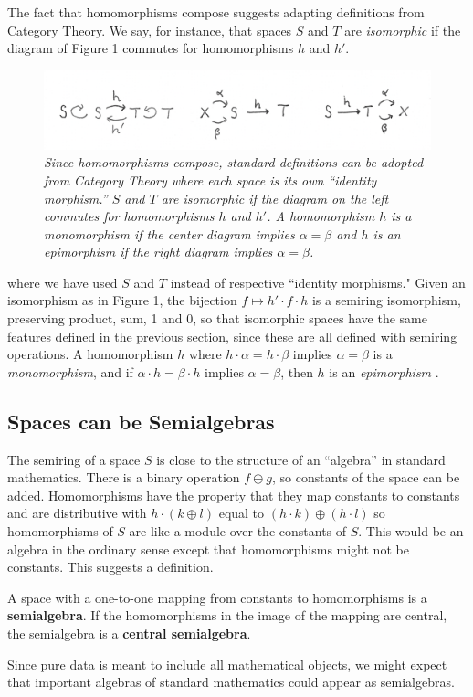 \documentclass[11pt]{article}
\begin{document}
The fact that homomorphisms compose suggests adapting definitions from Category Theory.  
We say, for instance, that spaces $S$ and $T$ are {\it isomorphic} if the diagram of Figure 1 commutes for homomorphisms 
$h$ and $h'$.  
\begin{figure}[h]
\centering
\includegraphics[width=1.0\textwidth]{isomorphism.png}
\caption{{\it Since homomorphisms compose, standard definitions can be adopted from Category Theory where each space is its own ``identity morphism.'' 
$S$ and $T$ are isomorphic if the diagram on the left commutes for homomorphisms $h$ and $h'$.  A homomorphism $h$ is a monomorphism if the center 
diagram implies $\alpha=\beta$ and $h$ is an epimorphism if the right diagram implies $\alpha=\beta$.}}  
\end{figure}
where we have used $S$ and $T$ instead of respective ``identity morphisms."  Given an isomorphism as in Figure 1, the bijection $f\mapsto h'\cdot f \cdot h$ is 
a semiring isomorphism, preserving product, sum, 1 and 0, so that isomorphic spaces have the same features defined in the previous section, since 
these are all defined with semiring operations.  A homomorphism $h$ where $h\cdot \alpha=h\cdot \beta$ implies $\alpha=\beta$ is a {\it monomorphism}, and if $\alpha\cdot h=\beta\cdot h$ implies $\alpha=\beta$, then $h$ is an {\it epimorphism} \cite{categories}.  

\subsection{Spaces can be Semialgebras} 

The semiring of a space $S$ is close to the structure of an ``algebra'' in standard mathematics.  There is a binary operation $f\oplus g$, so 
constants of the space can be added.  Homomorphisms have the property that they map constants to constants and are distributive with 
$h\cdot (k\oplus l)$ equal to $(h\cdot k)\oplus (h\cdot l)$ so homomorphisms of $S$ are like a module over the constants of $S$.  This would 
be an algebra in the ordinary sense except that homomorphisms might not be constants.  This suggests a definition. 

\begin{definition}
A space with a one-to-one mapping from constants to homomorphisms is a {\bf semialgebra}.  If the homomorphisms 
in the image of the mapping are central, the semialgebra is a {\bf central semialgebra}.  
\end{definition}
\noindent Since pure data is meant to include all mathematical objects, we might expect that important algebras of standard 
mathematics could appear as semialgebras. 
\end{document}

